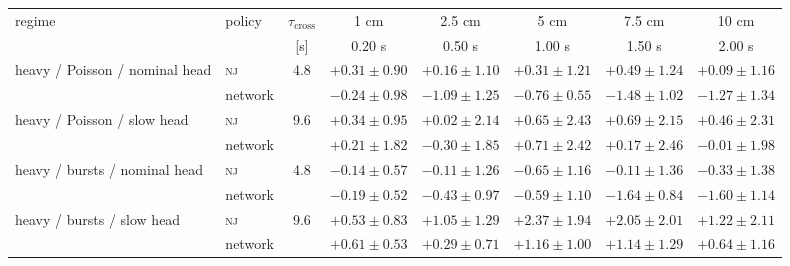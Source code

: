 \begin{tabular}{@{}llcccccc@{}}
\toprule
regime & policy & $\tau_{\mathrm{cross}}$ & 1 cm & 2.5 cm & 5 cm & 7.5 cm & 10 cm \\
 & & [s] & 0.20 s & 0.50 s & 1.00 s & 1.50 s & 2.00 s \\
\midrule
heavy / Poisson / nominal head & \textsc{nj} & 4.8 & $+0.31 \pm 0.90$ & $+0.16 \pm 1.10$ & $+0.31 \pm 1.21$ & $+0.49 \pm 1.24$ & $+0.09 \pm 1.16$ \\
 & network &  & $-0.24 \pm 0.98$ & $-1.09 \pm 1.25$ & $-0.76 \pm 0.55$ & $-1.48 \pm 1.02$ & $-1.27 \pm 1.34$ \\
heavy / Poisson / slow head & \textsc{nj} & 9.6 & $+0.34 \pm 0.95$ & $+0.02 \pm 2.14$ & $+0.65 \pm 2.43$ & $+0.69 \pm 2.15$ & $+0.46 \pm 2.31$ \\
 & network &  & $+0.21 \pm 1.82$ & $-0.30 \pm 1.85$ & $+0.71 \pm 2.42$ & $+0.17 \pm 2.46$ & $-0.01 \pm 1.98$ \\
heavy / bursts / nominal head & \textsc{nj} & 4.8 & $-0.14 \pm 0.57$ & $-0.11 \pm 1.26$ & $-0.65 \pm 1.16$ & $-0.11 \pm 1.36$ & $-0.33 \pm 1.38$ \\
 & network &  & $-0.19 \pm 0.52$ & $-0.43 \pm 0.97$ & $-0.59 \pm 1.10$ & $-1.64 \pm 0.84$ & $-1.60 \pm 1.14$ \\
heavy / bursts / slow head & \textsc{nj} & 9.6 & $+0.53 \pm 0.83$ & $+1.05 \pm 1.29$ & $+2.37 \pm 1.94$ & $+2.05 \pm 2.01$ & $+1.22 \pm 2.11$ \\
 & network &  & $+0.61 \pm 0.53$ & $+0.29 \pm 0.71$ & $+1.16 \pm 1.00$ & $+1.14 \pm 1.29$ & $+0.64 \pm 1.16$ \\
\bottomrule
\end{tabular}
